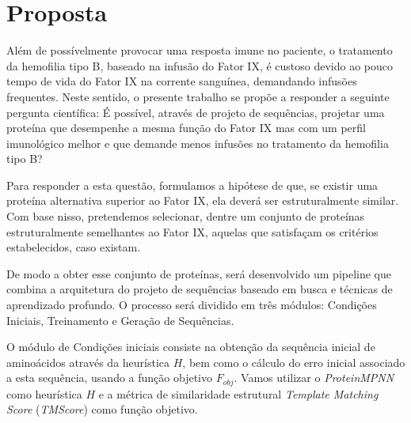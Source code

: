 \section{Proposta} 
\label{section:Proposta}
Além de possívelmente provocar uma resposta imune no paciente, o tratamento da hemofilia tipo B, baseado na infusão do Fator IX, é custoso devido ao pouco tempo de vida do Fator IX na corrente sanguínea, demandando infusões frequentes. 
Neste sentido, o presente trabalho se propõe a responder a seguinte pergunta científica: É possível, através de projeto de sequências, projetar uma proteína que desempenhe a mesma função do Fator IX mas com um perfil imunológico melhor e que demande menos infusões no tratamento da hemofilia tipo B?

Para responder a esta questão, formulamos a hipótese de que, se existir uma proteína alternativa superior ao Fator IX, ela deverá ser estruturalmente similar. Com base nisso, pretendemos selecionar, dentre um conjunto de proteínas estruturalmente semelhantes ao Fator IX, aquelas que satisfaçam os critérios estabelecidos, caso existam.

De modo a obter esse conjunto de proteínas, será desenvolvido um pipeline que combina a arquitetura do projeto de sequências baseado em busca e técnicas de aprendizado profundo.
O processo será dividido em três módulos: Condições Iniciais, Treinamento e Geração de Sequências. 

O módulo de Condições iniciais consiste na obtenção da sequência inicial de aminoácidos através da heurística $H$, bem como o cálculo do erro inicial associado a esta sequência, usando a função objetivo $F_{obj}$. 
Vamos utilizar o \textit{ProteinMPNN} como heurística $H$ e a métrica de similaridade estrutural \textit{Template Matching Score} (\textit{TMScore}) como função objetivo.

